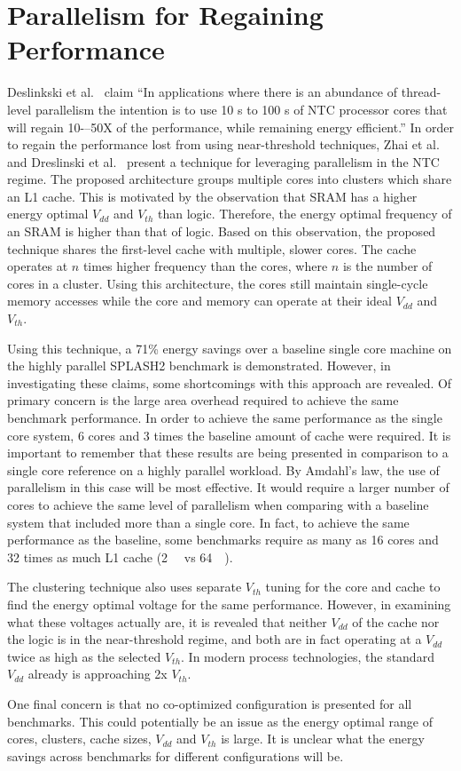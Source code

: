 \section{Parallelism for Regaining Performance}
\label{sec:clustering}

Deslinkski et al.~\cite{dreslinski2010near} claim ``In applications where there
is an abundance of thread-level parallelism the intention is to use 10 s to 100
s of NTC processor cores that will regain 10-–50X of the performance, while
remaining energy efficient.'' In order to regain the performance lost from using
near-threshold techniques, Zhai et al.~\cite{Zhai:2007kn} and Dreslinski et
al.~\cite{Dreslinski:2007id} present a technique for leveraging parallelism in
the NTC regime. The proposed architecture groups multiple cores into clusters
which share an L1 cache. This is motivated by the observation that SRAM has a
higher energy optimal $V_{dd}$ and $V_{th}$ than logic. Therefore, the energy
optimal frequency of an SRAM is higher than that of logic. Based on this
observation, the proposed technique shares the first-level cache with multiple,
slower cores.  The cache operates at $n$ times higher frequency than the cores,
where $n$ is the number of cores in a cluster.  Using this architecture, the
cores still maintain single-cycle memory accesses while the core and memory can
operate at their ideal $V_{dd}$ and $V_{th}$.

Using this technique, a 71\% energy savings over a baseline single core machine
on the highly parallel SPLASH2 benchmark is demonstrated. However, in
investigating these claims, some shortcomings with this approach are revealed.
Of primary concern is the large area overhead required to achieve the same
benchmark performance. In order to achieve the same performance as the single
core system, 6 cores and 3 times the baseline amount of cache were required. It
is important to remember that these results are being presented in comparison to
a single core reference on a highly parallel workload. By Amdahl's law, the use
of parallelism in this case will be most effective. It would require a larger
number of cores to achieve the same level of parallelism when comparing with a
baseline system that included more than a single core. In fact, to achieve the
same performance as the baseline, some benchmarks require as many as 16 cores
and 32 times as much L1 cache (\SI{2}{\mega\byte} vs \SI{64}{\kilo\byte}).

The clustering technique also uses separate $V_{th}$ tuning for the core and
cache to find the energy optimal voltage for the same performance. However, in
examining what these voltages actually are, it is revealed that neither $V_{dd}$
of the cache nor the logic is in the near-threshold regime, and both are in fact
operating at a $V_{dd}$ twice as high as the selected $V_{th}$. In modern
process technologies, the standard $V_{dd}$ already is approaching 2x $V_{th}$.

One final concern is that no co-optimized configuration is presented for all
benchmarks. This could potentially be an issue as the energy optimal range of
cores, clusters, cache sizes, $V_{dd}$ and $V_{th}$ is large. It is unclear what
the energy savings across benchmarks for different configurations will be.
